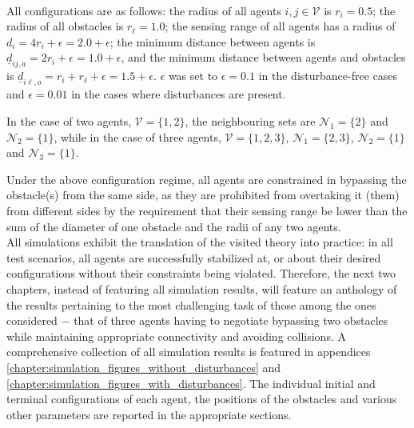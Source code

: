 \noindent{}\\[2.5ex]

All configurations are as follows: the radius of all agents
$i,j \in \mathcal{V}$ is $r_i = 0.5$; the radius of all obstacles is
$r_{\ell} = 1.0$; the sensing range of all agents has a radius of
$d_i = 4r_i + \epsilon = 2.0 + \epsilon$; the minimum distance between agents
is $\underline{d}_{ij,a} = 2r_i + \epsilon = 1.0 + \epsilon$, and the minimum
distance between agents and obstacles is
$\underline{d}_{i\ell,o} = r_i + r_{\ell} + \epsilon = 1.5 + \epsilon$.
$\epsilon$ was set to $\epsilon = 0.1$ in the disturbance-free cases and
$\epsilon = 0.01$ in the cases where disturbances are present.

In the case of two agents, $\mathcal{V} = \{1,2\}$,
the neighbouring sets are $\mathcal{N}_1 = \{2\}$
and $\mathcal{N}_2 = \{1\}$, while in the case of three agents,
$\mathcal{V} = \{1,2,3\}$, $\mathcal{N}_1 = \{2,3\}$,
$\mathcal{N}_2 = \{1\}$ and $\mathcal{N}_3 = \{1\}$.

Under the above configuration regime, all agents are constrained in bypassing
the obstacle(s) from the same side, as they are prohibited from overtaking it
(them) from different sides by the requirement that their sensing range be
lower than the sum of the diameter of one obstacle and the radii of any two
agents.\\[2.5ex]

All simulations exhibit the translation of the visited theory into practice:
in all test scenarios, all agents are successfully stabilized at, or about
their desired configurations without their constraints being violated.
Therefore, the next two chapters, instead of featuring all simulation results,
will feature an anthology of the results pertaining to the most challenging task
of those among the ones considered $-$ that of three agents having to negotiate
bypassing two obstacles while maintaining appropriate connectivity and avoiding
collisions. A comprehensive collection of all simulation results is featured in
appendices \ref{chapter:simulation_figures_without_disturbances} and
\ref{chapter:simulation_figures_with_disturbances}. The individual initial
and terminal configurations of each agent, the positions of the obstacles and
various other parameters are reported in the appropriate sections.
